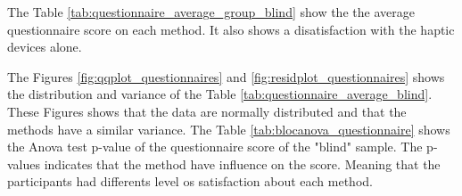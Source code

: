 The Table \ref{tab:questionnaire_average_group_blind} show the the average questionnaire score on each method. It also shows a disatisfaction with the haptic devices alone.



The Figures \ref{fig:qqplot_questionnaires} and \ref{fig:residplot_questionnaires} shows the distribution and variance of the Table \ref{tab:questionnaire_average_blind}. These Figures shows that the data are normally distributed and that the methods have a similar variance.
The Table \ref{tab:blocanova_questionnaire} shows the Anova test p-value of the questionnaire score of the "blind" sample. The p-values indicates that the method have influence on the score. Meaning that the participants had differents level os satisfaction about each method.



